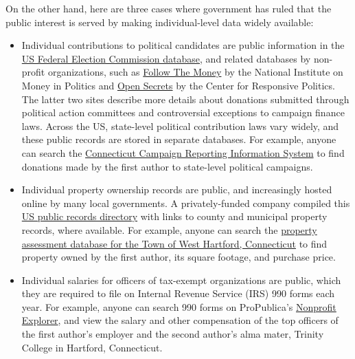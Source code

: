 \documentclass[
  english,
]{book}
\begin{document}
On the other hand, here are three cases where government has ruled that the public interest is served by making individual-level data widely available:

\begin{itemize}
\item
  Individual contributions to political candidates are public information in the \href{https://www.fec.gov/data/receipts/individual-contributions/}{US Federal Election Commission database}, and related databases by non-profit organizations, such as \href{https://www.followthemoney.org/}{Follow The Money} by the National Institute on Money in Politics and \href{https://www.opensecrets.org/}{Open Secrets} by the Center for Responsive Politics. The latter two sites describe more details about donations submitted through political action committees and controversial exceptions to campaign finance laws. Across the US, state-level political contribution laws vary widely, and these public records are stored in separate databases. For example, anyone can search the \href{https://seec.ct.gov/Portal/eCRIS/eCrisSearch}{Connecticut Campaign Reporting Information System} to find donations made by the first author to state-level political campaigns.
\item
  Individual property ownership records are public, and increasingly hosted online by many local governments. A privately-funded company compiled this \href{https://publicrecords.netronline.com/}{US public records directory} with links to county and municipal property records, where available. For example, anyone can search the \href{https://gis.vgsi.com/westhartfordct/}{property assessment database for the Town of West Hartford, Connecticut} to find property owned by the first author, its square footage, and purchase price.
\item
  Individual salaries for officers of tax-exempt organizations are public, which they are required to file on Internal Revenue Service (IRS) 990 forms each year. For example, anyone can search 990 forms on ProPublica's \href{https://projects.propublica.org/nonprofits}{Nonprofit Explorer}, and view the salary and other compensation of the top officers of the first author's employer and the second author's alma mater, Trinity College in Hartford, Connecticut.
\end{itemize}
\end{document}
